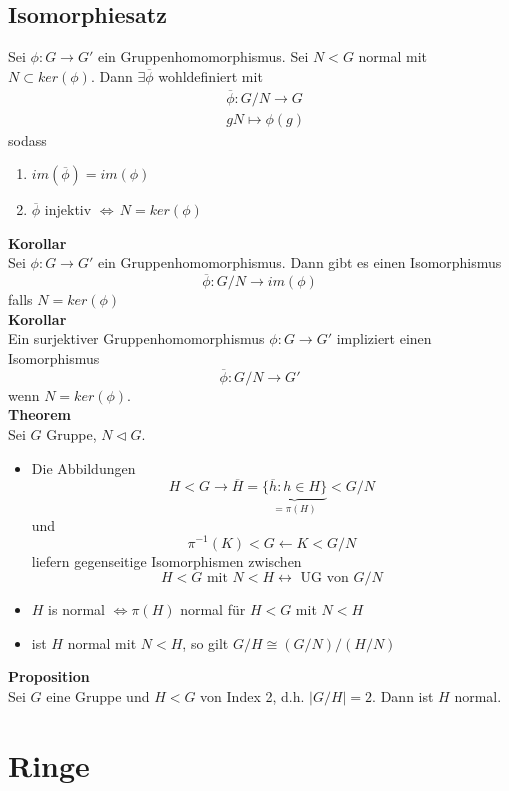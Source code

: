 \documentclass[a4paper, 12pt]{article}
\begin{document}
\subsection{Isomorphiesatz}
Sei $\phi: G\to G'$ ein Gruppenhomomorphismus. Sei $N<G$ normal mit $N\subset ker(\phi)$. Dann $\exists \overline{\phi}$ wohldefiniert mit \begin{eqnarray*}
	& \overline{\phi}: G/N \to G\\
	& gN \mapsto \phi(g)
\end{eqnarray*}
sodass \begin{enumerate}
	\item $im(\overline{\phi}) = im(\phi)$
	\item $\overline{\phi}$ injektiv $\Leftrightarrow \, N = ker(\phi)$
\end{enumerate}
\textbf{Korollar}\\
Sei $\phi: G\to G'$ ein Gruppenhomomorphismus. Dann gibt es einen Isomorphismus \[\overline{\phi}: G/N \to im(\phi)\] falls $N = ker(\phi)$\\
\textbf{Korollar}\\
Ein surjektiver Gruppenhomomorphismus $\phi: G \to G'$ impliziert einen Isomorphismus \[\overline{\phi}: G/N \to G'\] wenn $N = ker(\phi)$.\\
\textbf{Theorem}\\
Sei $G$ Gruppe, $N\triangleleft G$. \begin{itemize}
	\item Die Abbildungen \[H<G \to \overline{H} = \underbrace{\{\overline{h}: h \in H\}}_{=\pi(H)} < G/N\] und \[\pi^{-1}(K)<G \leftarrow K<G/N\] liefern gegenseitige Isomorphismen zwischen \[H<G \text{ mit } N<H \leftrightarrow \text{ UG von } G/N\]
	\item $H$ is normal $\Leftrightarrow \pi(H)$ normal für $H<G$ mit $N<H$
	\item ist $H$ normal mit $N<H$, so gilt $G/H \cong (G/N)/(H/N)$
\end{itemize}
\textbf{Proposition}\\
Sei $G$ eine Gruppe und $H<G$ von Index 2, d.h. $\left|G/H\right| = 2$. Dann ist $H$ normal.
\section{Ringe}
\end{document}

